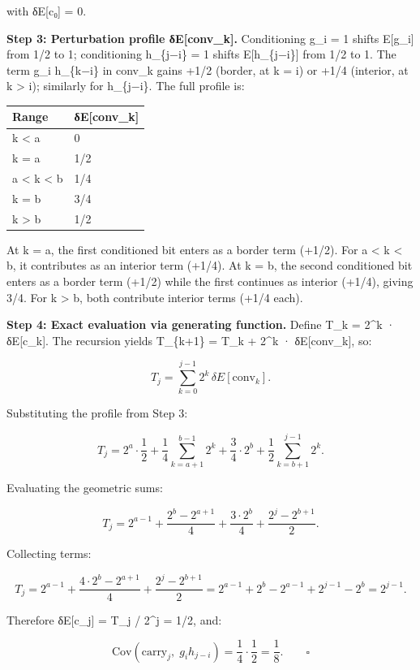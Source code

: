 \documentclass[
  11pt,
]{article}
\begin{document}
with δE{[}c₀{]} = 0.

\textbf{Step 3: Perturbation profile δE{[}conv\_k{]}.} Conditioning g\_i = 1
shifts E{[}g\_i{]} from 1/2 to 1; conditioning h\_\{j−i\} = 1 shifts
E{[}h\_\{j−i\}{]} from 1/2 to 1. The term g\_i h\_\{k−i\} in conv\_k gains +1/2
(border, at k = i) or +1/4 (interior, at k \textgreater{} i); similarly for
h\_\{j−i\}. The full profile is:

\begin{longtable}[]{@{}ll@{}}
\toprule\noalign{}
Range & δE{[}conv\_k{]} \\
\midrule\noalign{}
\endhead
\bottomrule\noalign{}
\endlastfoot
k \textless{} a & 0 \\
k = a & 1/2 \\
a \textless{} k \textless{} b & 1/4 \\
k = b & 3/4 \\
k \textgreater{} b & 1/2 \\
\end{longtable}

At k = a, the first conditioned bit enters as a border term (+1/2). For a
\textless{} k \textless{} b, it contributes as an interior term (+1/4). At k =
b, the second conditioned bit enters as a border term (+1/2) while the first
continues as interior (+1/4), giving 3/4. For k \textgreater{} b, both
contribute interior terms (+1/4 each).

\textbf{Step 4: Exact evaluation via generating function.} Define T\_k = 2\^{}k
· δE{[}c\_k{]}. The recursion yields T\_\{k+1\} = T\_k + 2\^{}k ·
δE{[}conv\_k{]}, so:

\[T_j = \sum_{k=0}^{j-1} 2^k \,\delta E[\text{conv}_k].\]

Substituting the profile from Step 3:

\[T_j = 2^a \cdot \frac{1}{2} + \frac{1}{4}\sum_{k=a+1}^{b-1} 2^k + \frac{3}{4} \cdot 2^b + \frac{1}{2}\sum_{k=b+1}^{j-1} 2^k.\]

Evaluating the geometric sums:

\[T_j = 2^{a-1} + \frac{2^b - 2^{a+1}}{4} + \frac{3 \cdot 2^b}{4} + \frac{2^j - 2^{b+1}}{2}.\]

Collecting terms:

\[T_j = 2^{a-1} + \frac{4 \cdot 2^b - 2^{a+1}}{4} + \frac{2^j - 2^{b+1}}{2} = 2^{a-1} + 2^b - 2^{a-1} + 2^{j-1} - 2^b = 2^{j-1}.\]

Therefore δE{[}c\_j{]} = T\_j / 2\^{}j = 1/2, and:

\[\text{Cov}(\text{carry}_j,\; g_i h_{j-i}) = \frac{1}{4} \cdot \frac{1}{2} = \frac{1}{8}. \qquad \square\]
\end{document}
